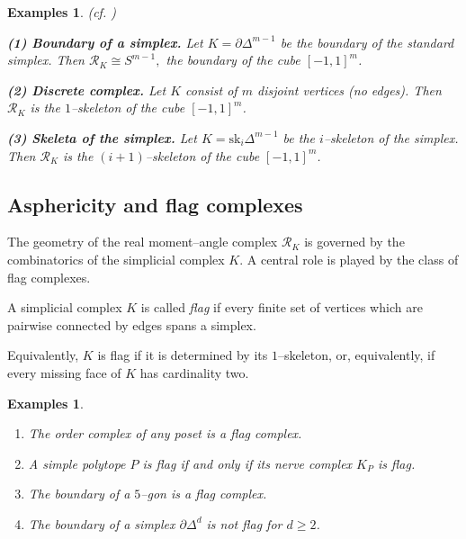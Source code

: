 \documentclass[11pt,a4paper]{article}
\numberwithin{equation}{section}
\newtheorem{exs}[definition]{Examples}}
\theoremstyle{named}
\begin{document}
\begin{exs}(cf. \cite[Examples 4.1.6]{tt})

\textbf{(1) Boundary of a simplex.}
Let $K = \partial \Delta^{m-1}$ be the boundary of the standard simplex. Then \(\mathcal{R}_K \cong S^{m-1},\) the boundary of the cube $[-1,1]^m$.

\medskip

\textbf{(2) Discrete complex.}
Let $K$ consist of $m$ disjoint vertices (no edges). Then \(\mathcal{R}_K\) is the $1$--skeleton of the cube $[-1,1]^m$.

\medskip

\textbf{(3) Skeleta of the simplex.}
Let $K = \mathrm{sk}_i \Delta^{m-1}$ be the $i$--skeleton of the simplex. Then $\mathcal{R}_K$ is the $(i+1)$--skeleton of the cube $[-1,1]^m$.
\end{exs}

\subsection{Asphericity and flag complexes}
\label{sec:flag_aspherical}

The geometry of the real moment--angle complex $\mathcal{R}_K$ is governed
by the combinatorics of the simplicial complex $K$. A central role is played
by the class of flag complexes.

\begin{definition}[cf. {\cite[Definition 2.3.9]{tt}}]
A simplicial complex $K$ is called \emph{flag} if every finite set of vertices
which are pairwise connected by edges spans a simplex.
\end{definition}

Equivalently, $K$ is flag if it is determined by its $1$--skeleton, or,
equivalently, if every missing face of $K$ has cardinality two.

\medskip

\begin{exs}
\begin{enumerate}
    \item[(1)] The order complex of any poset is a flag complex.
    \item[(2)] A simple polytope $P$ is flag if and only if its nerve complex $K_P$ is flag.
    \item[(3)] The boundary of a $5$--gon is a flag complex.
    \item[(4)] The boundary of a simplex $\partial \Delta^d$ is \textit{not flag} for $d \geq 2$.
\end{enumerate}
\end{exs}
\end{document}
